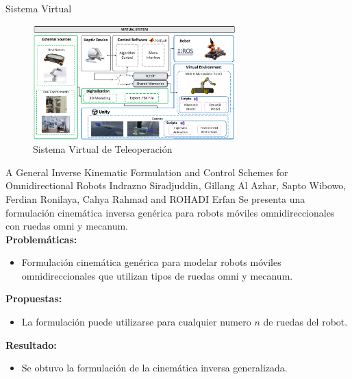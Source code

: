 \documentclass[10pt,aspectratio=169]{beamer}
\begin{document}
\begin{frame}{Sistema Virtual}
  \begin{figure}
    \begin{center}
      \includegraphics[width=0.7\textwidth]{figures/virtual-system.png}
    \end{center}
    \caption{Sistema Virtual de Teleoperación}\label{fig:virtualsystem}
  \end{figure}
\end{frame}

\begin{frame}{A General Inverse Kinematic Formulation and Control Schemes for  Omnidirectional Robots \scriptsize{Indrazno Siradjuddin, Gillang Al Azhar, Sapto Wibowo, Ferdian Ronilaya, Cahya Rahmad and ROHADI Erfan}}
  Se presenta una formulación cinemática inversa genérica para robots móviles omnidireccionales con ruedas omni y mecanum.\\[5pt]

  \textbf{Problemáticas:}
  \begin{itemize}
    \item Formulación cinemática genérica para modelar robots móviles omnidireccionales que utilizan tipos de ruedas omni y mecanum.
  \end{itemize}

  \textbf{Propuestas:}
  \begin{itemize}
    \item La formulación puede utilizarse para cualquier numero \(n\) de ruedas del robot.
  \end{itemize}

  \textbf{Resultado:}
  \begin{itemize}
    \item Se obtuvo la formulación de la cinemática inversa generalizada.
  \end{itemize}
\end{frame}
\end{document}
